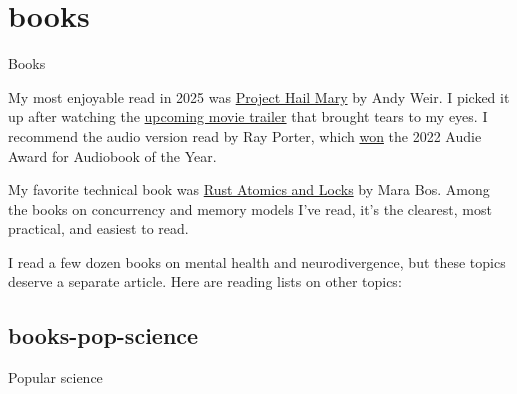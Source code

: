 \documentclass{article}
\begin{document}
\section{books}{Books}

My most enjoyable read in 2025 was \href{https://www.goodreads.com/book/show/54493401-project-hail-mary}{Project Hail Mary} by Andy Weir.
I picked it up after watching the \href{https://youtu.be/5VYsnngkS_U}{upcoming movie trailer} that brought tears to my eyes.
I recommend the audio version read by Ray Porter, which \href{https://en.wikipedia.org/wiki/Audie_Award_for_Audiobook_of_the_Year#2020s}{won} the 2022 Audie Award for Audiobook of the Year.

My favorite technical book was \href{https://www.goodreads.com/book/show/63291820-rust-atomics-and-locks}{Rust Atomics and Locks} by Mara Bos.
Among the books on concurrency and memory models I've read,
it's the clearest, most practical, and easiest to read.

I read a few dozen books on mental health and neurodivergence,
but these topics deserve a separate article.
Here are reading lists on other topics:

\subsection{books-pop-science}{Popular science}
\end{document}
